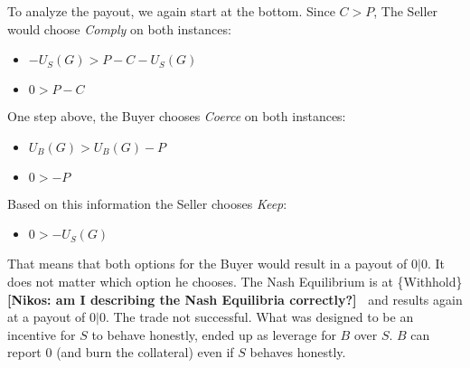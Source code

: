 \documentclass{cacthesis}
\newcommand{\authnote}[3]{{ \footnotesize \textbf{#1[#2: #3]~}}}
\newcommand{\niknote}[1]{\authnote{\color{red}}{Nikos}{#1}}
\begin{document}
To analyze the payout, we again start at the bottom. Since $C>P$, The Seller would choose \emph{Comply} on both instances:
\begin{itemize}
    \item $-U_S(G) > P-C-U_S(G)$
    \item $0 > P-C$
\end{itemize}
One step above, the Buyer chooses \emph{Coerce} on both instances:
\begin{itemize}
    \item $U_B(G)> U_B(G)-P$
    \item $0 > -P$
\end{itemize}
Based on this information the Seller chooses \emph{Keep}: 
\begin{itemize}
    \item $0> -U_S(G)$
\end{itemize}
That means that both options for the Buyer would result in a payout of $0|0$. It does not matter which option he chooses.
The Nash Equilibrium is at \{Withhold\} \niknote{am I describing the Nash Equilibria correctly?} and results again at a payout of $0|0$.  The trade not successful.
What was designed to be an incentive for $S$ to behave honestly, ended up as leverage for $B$ over $S$. $B$ can report 0 (and burn the collateral) even if $S$ behaves honestly. 
\end{document}
